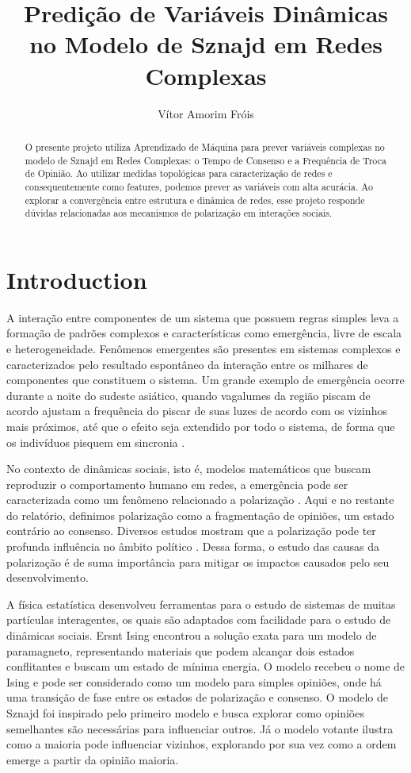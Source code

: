 \documentclass{article}
\title{Predição de Variáveis Dinâmicas no Modelo de Sznajd em Redes Complexas}
\author{Vítor Amorim Fróis}
\begin{document}
\maketitle

\begin{abstract}
    O presente projeto utiliza Aprendizado de Máquina para prever variáveis complexas no modelo de Sznajd em Redes Complexas: o Tempo de Consenso e a Frequência de Troca de Opinião. Ao utilizar medidas topológicas para caracterização de redes e consequentemente como features, podemos prever as variáveis com alta acurácia.
    Ao explorar a convergência entre estrutura e dinâmica de redes, esse projeto responde dúvidas relacionadas aos mecanismos de polarização em interações sociais.
\end{abstract}

\section{Introduction}
A interação entre componentes de um sistema que possuem regras simples leva a formação de padrões complexos e características como emergência, livre de escala e heterogeneidade. Fenômenos emergentes são presentes em sistemas complexos e caracterizados pelo resultado espontâneo da interação entre os milhares de componentes que constituem o sistema. Um grande exemplo de emergência ocorre durante a noite do sudeste asiático, quando vagalumes da região piscam de acordo ajustam a frequência do piscar de suas luzes de acordo com os vizinhos mais próximos, até que o efeito seja extendido por todo o sistema, de forma que os indivíduos pisquem em sincronia \cite{johnson2002emergence}.

No contexto de dinâmicas sociais, isto é, modelos matemáticos que buscam reproduzir o comportamento humano em redes, a emergência pode ser caracterizada como um fenômeno relacionado a polarização \cite{maia2021emergence}. Aqui e no restante do relatório, definimos polarização como a fragmentação de opiniões, um estado contrário ao consenso. Diversos estudos mostram que a polarização pode ter profunda influência no âmbito político \cite{interian2023polarization,layton2021polarization}. Dessa forma, o estudo das causas da polarização é de suma importância para mitigar os impactos causados pelo seu desenvolvimento.

A física estatística desenvolveu ferramentas para o estudo de sistemas de muitas partículas interagentes, os quais são adaptados com facilidade para o estudo de dinâmicas sociais. Ersnt Ising encontrou a solução exata para um modelo de paramagneto, representando materiais que podem alcançar dois estados conflitantes e buscam um estado de mínima energia. O modelo recebeu o nome de Ising e pode ser considerado como um modelo para simples opiniões, onde há uma transição de fase entre os estados de polarização e consenso. O modelo de Sznajd foi inspirado pelo primeiro modelo e busca explorar como opiniões semelhantes são necessárias para influenciar outros. Já o modelo votante ilustra como a maioria pode influenciar vizinhos, explorando por sua vez como a ordem emerge a partir da opinião maioria.
\end{document}
